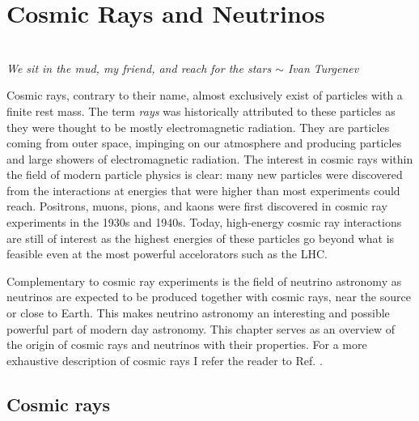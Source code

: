 \chapter{Cosmic Rays and Neutrinos}
\label{ch:cr}
\begin{flushright}
\textit{\\We sit in the mud, my friend, and reach for the stars $\sim$ Ivan Turgenev\\}\end{flushright}


\noindent Cosmic rays, contrary to their name, almost exclusively exist of particles with a finite rest mass. The term \textit{rays} was historically attributed to these particles as they were thought to be mostly electromagnetic radiation. They are particles coming from outer space, impinging on our atmosphere and producing particles and large showers of electromagnetic radiation.
The interest in cosmic rays within the field of modern particle physics is clear: many new particles were discovered from the interactions at energies that were higher than most experiments could reach. Positrons, muons, pions, and kaons were first discovered in cosmic ray experiments in the 1930s and 1940s. Today, high-energy cosmic ray interactions are still of interest as the highest energies of these particles go beyond what is feasible even at the most powerful accelorators such as the LHC.

Complementary to cosmic ray experiments is the field of neutrino astronomy as neutrinos are expected to be produced together with cosmic rays, near the source or close to Earth. This makes neutrino astronomy an interesting and possible powerful part of modern day astronomy. This chapter serves as an overview of the origin of cosmic rays and neutrinos with their properties. For a more exhaustive description of cosmic rays I refer the reader to Ref. \cite{Gaisser:2016uoy}.

\section{Cosmic rays}
